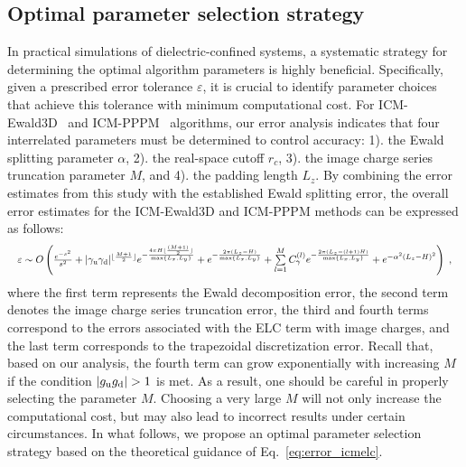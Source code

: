 \subsection{Optimal parameter selection strategy}\label{sec:parameter}
In practical simulations of dielectric-confined systems, a systematic strategy for determining the optimal algorithm parameters is highly beneficial. Specifically, given a prescribed error tolerance $\varepsilon$, it is crucial to identify parameter choices that achieve this tolerance with minimum computational cost. 
For ICM-Ewald3D~\cite{dos2015electrolytes} and ICM-PPPM~\cite{yuan2021particle} algorithms, 
our error analysis indicates that four interrelated parameters must be determined to control accuracy: 1). the Ewald splitting parameter $\alpha$, 2). the real-space cutoff $r_c$, 3). the image charge series truncation parameter $M$, and 4). the padding length $L_z$. 
By combining the error estimates from this study with the established Ewald splitting error, the overall error estimates for the ICM-Ewald3D and ICM-PPPM methods can be expressed as follows:
\begin{equation}\label{eq:error_icmelc}
\resizebox{0.8\width}{!}{\(
\varepsilon \sim O\left(\frac{e^{-s^2}}{s^2}+\abs{\gamma_{\T u} \gamma_{\T d}}^{\lfloor\frac{M+1}{2}\rfloor} e^{-\frac{4\pi H \lfloor\frac{(M+1)}{2}\rfloor}{\max\{L_x,L_y\}}} + e^{-\frac{2\pi(L_z-H)}{\max\{L_x,L_y\}}} + \sum\limits_{l=1}^{M}C_{\gamma}^{(l)}e^{-\frac{2\pi(L_z-(l+1)H)}{\max\{L_x,L_y\}}}+e^{-\alpha^2 (L_z-H)^2}\right)\;,
\)}
\end{equation}
where the first term represents the Ewald decomposition error, the second term denotes the image charge series truncation error, the third and fourth terms correspond to the errors associated with the ELC term with image charges, and the last term corresponds to the trapezoidal discretization error.
Recall that, based on our analysis, the fourth term can grow exponentially with increasing $M$ if the condition $|g_{\text{u}}g_{\text{d}}| > 1$ is met. 
As a result, one should be careful in properly selecting the parameter $M$. 
Choosing a very large $M$ will not only increase the computational cost, but may also lead to incorrect results under certain circumstances.
In what follows, we propose an optimal parameter selection strategy based on the theoretical guidance of Eq.~\eqref{eq:error_icmelc}.

